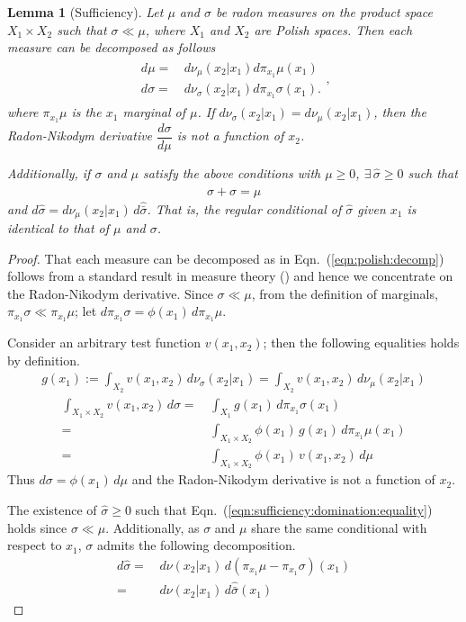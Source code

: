 \documentclass[dvipsnames]{article}
\newtheorem{lemma}{Lemma}
\begin{document}
\begin{lemma}[Sufficiency]
\label{lemma:sufficiency}
    Let $\mu$ and $\sigma$ be radon measures on the product space $X_1\times X_2$ such that $\sigma \ll \mu$, where $X_1$ and $X_2$ are Polish spaces. Then each measure can be decomposed as follows
    \begin{align}
    \begin{aligned}
        d\mu=&\,d\nu_{\mu}(x_2|x_1)d\pi_{x_1}\mu(x_1)\\
        d\sigma=&\,d\nu_{\sigma}(x_2|x_1)d\pi_{x_1}\sigma(x_1).
        \end{aligned},
        \label{eqn:polish:decomp}
    \end{align}
    where $\pi_{x_1}\mu$ is the $x_1$ marginal of $\mu$. If $d\nu_\sigma(x_2|x_1)=d\nu_{\mu}(x_2|x_1)$, then the Radon-Nikodym derivative $\dfrac{d\sigma}{d\mu}$ is not a function of $x_2$.
    \par
    Additionally, if $\sigma$ and $\mu$ satisfy the above conditions with $\mu\ge 0$, $\exists\, \hat\sigma\ge 0$ such that
    \begin{align}
      \sigma+\hat\sigma=\mu\label{eqn:sufficiency:domination:equality}
    \end{align}
    and $d\hat\sigma=d\nu_\mu(x_2|x_1)\,d\hat{\bar\sigma}$. That is, the regular conditional of $\hat \sigma$ given $x_1$ is identical to that of $\mu$ and $\sigma$.
\end{lemma}
\begin{proof}
  That each measure can be decomposed as in Eqn.~(\ref{eqn:polish:decomp}) follows from a standard result in measure theory (\cite{bogachev_v2}) and hence we concentrate on the Radon-Nikodym derivative. Since $\sigma\ll \mu$, from the definition of marginals, $\pi_{x_1}\sigma\ll \pi_{x_1}\mu$; let $d\pi_{x_1}\sigma=\phi(x_1)\,d\pi_{x_1}\mu$.\par
  Consider an arbitrary test function $v(x_1,x_2)$; then the following equalities holds by definition.
  \begin{align*}
    g(x_1):=\int_{X_2}v(x_1,x_2)\,d\nu_{\sigma}(x_2|x_1)=\int_{X_2}v(x_1,x_2)\,d\nu_{\mu}(x_2|x_1)
  \end{align*}
  \begin{align*}
    \int_{X_1\times X_2} v(x_1,x_2)\,d\sigma=&\,\int_{X_1}g(x_1)\,d\pi_{x_1}\sigma(x_1)\\
    =&\,\int_{X_1\times X_2}\phi(x_1)\,g(x_1)\,d\pi_{x_1}\mu(x_1)\\
    =&\,\int_{X_1\times X_2} \phi(x_1)\,v(x_1,x_2)\,d\mu
  \end{align*}
  Thus $d\sigma=\phi(x_1)\,d\mu$ and the Radon-Nikodym derivative is not a function of $x_2$.
  \par
  The existence of $\hat\sigma \ge 0$ such that Eqn.~(\ref{eqn:sufficiency:domination:equality}) holds since $\sigma\ll\mu$. Additionally, as $\sigma$ and $\mu$ share the same conditional with respect to $x_1$, $\sigma$ admits the following decomposition.
  \begin{align*}
    d\hat \sigma=&\,d\nu(x_2|x_1)\,d(\pi_{x_1}\mu-\pi_{x_1}\sigma)(x_1)\\
    =&\,d\nu(x_2|x_1)\,d\hat{\bar\sigma}(x_1)
  \end{align*}
\end{proof}
\end{document}
